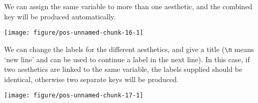 \documentclass[paper=a4,10pt,div=17,headsepline,BCOR=12mm,twoside,open=right]{scrbook}\usepackage{knitr}
\begin{document}
We can assign the same variable to more than one aesthetic, and the combined key will be produced automatically.

\begin{knitrout}\footnotesize
{}\color{fgcolor}\begin{kframe}
\begin{alltt}
 \hlstd{(}  \hlstd{=} \hlstd{=} \hlopt{+} \hlstd{()}
\end{alltt}
\end{kframe}

{\centering \texttt{[image: figure/pos-unnamed-chunk-16-1]} 

}



\end{knitrout}

We can change the labels for the different aesthetics, and give a title (\verb!\n! means `new line' and can be used to continue a label in the next line). In this case, if two aesthetics are linked to the same variable, the labels supplied should be identical, otherwise two separate keys will be produced.

\begin{knitrout}\footnotesize
{}\color{fgcolor}\begin{kframe}
\begin{alltt}
 \hlstd{(}  \hlstd{=} \hlstd{=} \hlopt{+}
  \hlstd{()} \hlopt{+}
    \hlstd{(}\hlstd{=}\hlstd{,}
       \hlstd{=}\hlstd{,}
       \hlstd{=}\hlstd{,}
       \hlstd{=}\hlstd{,}
       \hlstd{=}\hlstd{)}
\end{alltt}
\end{kframe}

{\centering \texttt{[image: figure/pos-unnamed-chunk-17-1]} 

}



\end{knitrout}
\end{document}

